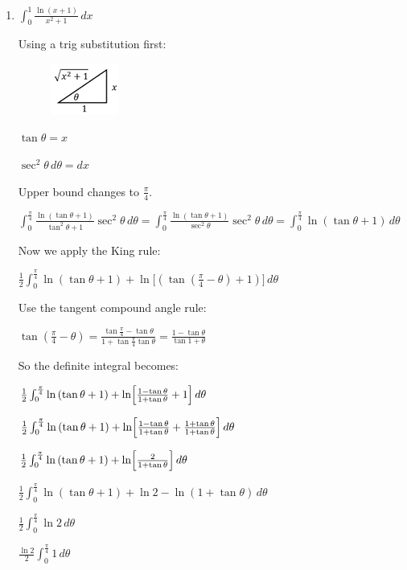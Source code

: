 \documentclass[../main.tex]{subfiles}
\begin{document}
\begin{enumerate}[itemsep=0.7cm]
    \item 
    $\int_0^1 \frac{\ln{(x+1)}}{x^2+1}\,dx$
    
    Using a trig substitution first:

    \begin{figure}[h]
        \centering
        \includegraphics{images/trigsuba8.png}
    \end{figure}

    $\tan{\theta}=x$

    $\sec^2{\theta}\,d\theta=dx$

    Upper bound changes to $\frac{\pi}{4}$.

    $\int_0^{\frac{\pi}{4}} \frac{\ln{(\tan{\theta}+1)}}{\tan^2{\theta}+1}\sec^2{\theta}\,d\theta=\int_0^{\frac{\pi}{4}} \frac{\ln{(\tan{\theta}+1)}}{\sec^2{\theta}}\sec^2{\theta}\,d\theta=\int_0^{\frac{\pi}{4}} \ln{(\tan{\theta}+1)}\,d\theta$

    Now we apply the King rule:

    $\frac{1}{2}\int_0^{\frac{\pi}{4}} \ln{(\tan{\theta}+1)}+\ln\bigl[(\tan{(\frac{\pi}{4}-\theta)}+1)\bigr]\,d\theta$

    Use the tangent compound angle rule:

    $\tan{(\frac{\pi}{4}-\theta)}=\frac{\tan{\frac{\pi}{4}}-\tan{\theta}}{1+\tan{\frac{\pi}{4}}\tan{\theta}}=\frac{1-\tan{\theta}}{\tan{1+\theta}}$

    So the definite integral becomes:

    $\frac{1}{2}\int_0^{\frac{\pi}{4}} \ln{(\tan{\theta}+1)}+\ln\Bigl[\frac{1-\tan{\theta}}{1+\tan{\theta}}+1\Bigr]\,d\theta$

    $\frac{1}{2}\int_0^{\frac{\pi}{4}} \ln{(\tan{\theta}+1)}+\ln\Bigl[\frac{1-\tan{\theta}}{1+\tan{\theta}}+\frac{1+\tan{\theta}}{1+\tan{\theta}}\Bigr]\,d\theta$

    $\frac{1}{2}\int_0^{\frac{\pi}{4}} \ln{(\tan{\theta}+1)}+\ln\Bigl[\frac{2}{1+\tan{\theta}}\Bigr]\,d\theta$

    $\frac{1}{2}\int_0^{\frac{\pi}{4}} \ln{(\tan{\theta}+1)}+\ln{2}-\ln{(1+\tan{\theta})}\,d\theta$

    $\frac{1}{2}\int_0^{\frac{\pi}{4}} \ln{2}\,d\theta$

    $\frac{\ln{2}}{2}\int_0^{\frac{\pi}{4}} 1\,d\theta$


\end{enumerate}
\end{document}
